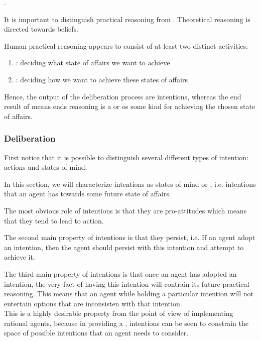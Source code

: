 .

It is important to distinguish practical reasoning from . Theoretical reasoning is directed towards beliefs. 

Human practical reasoning appears to consist of at least two distinct activities:
\begin{enumerate}
\item {}: deciding what state of affairs we want to achieve
\item {}: deciding how we want to achieve these states of affairs
\end{enumerate}

Hence, the output of the deliberation process are intentions, whereas the end result of means ends reasoning is a  or  os some kind for achieving the chosen state of affairs.
\subsubsection{Deliberation}

First notice that it is possible to distinguish several different types of intention: actions and states of mind.

In this section, we will characterize intentions as states of mind or , i.e. intentions that an agent has towards some future state of affairs.

The most obvious role of intentions is that they are pro-attitudes which means that they tend to lead to action.

The second main property of intentions is that they persist, i.e. If an agent adopt an intention, then the agent should persist with this intention and attempt to achieve it.

The third main property of intentions is that once an agent has adopted an intention, the very fact of having this intention will contrain its future practical reasoning. This means that an agent while holding a particular intention will not entertain options that are inconsisten with that intention.\\
This is a highly desirable property from the point of view of implementing rational agents, because in providing a , intentions can be seen to constrain the space of possible intentions that an agent needs to consider.

